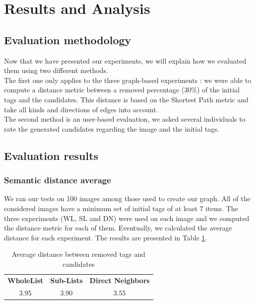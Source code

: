 \section{Results and Analysis} %
\label{sec:results_and_analysis}
\subsection{Evaluation methodology} %
\label{sub:evaluation_methodology}
Now that we have presented our experiments, we will explain how we evaluated them using two different methods.\\

The first one only applies to the three graph-based experiments : we were able to compute a distance metric between a removed percentage (30\%) of the initial tags and the candidates. This distance is based on the Shortest Path metric and take all kinds and directions of edges into account.\\

The second method is an user-based evaluation, we asked several individuals to rate the generated candidates regarding the image and the initial tags.\\


\subsection{Evaluation results} %
\label{sub:evaluation_results}
\subsubsection{Semantic distance average} %
\label{ssub:semantic_distance_average}
We ran our tests on 100 images among those used to create our graph. All of the considered images have a minimum set of initial tags of at least 7 items. The three experiments (WL, SL and DN) were used on each image and we computed the distance metric for each of them. Eventually, we calculated the average distance for each experiment. The results are presented in Table \ref{table:avgDist}.\\
\begin{table}[!h]
\centering
\begin{tabular}{ccc}
\cline{1-3}
\multicolumn{1}{|c|}{{\bf WholeList}} & \multicolumn{1}{c|}{{\bf Sub-Lists}} & \multicolumn{1}{c|}{{\bf Direct Neighbors}} \\ \cline{1-3}
\multicolumn{1}{|c|}{3.95}     & \multicolumn{1}{c|}{3.90}     & \multicolumn{1}{c|}{3.55} \\ \cline{1-3}
\end{tabular}
\caption{Average distance between removed tags and candidates}
\label{table:avgDist}
\end{table}

